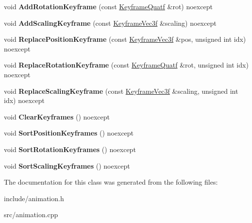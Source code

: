 \begin{DoxyCompactItemize}
\item 
\mbox{\label{class_blade_1_1_animation_a443dc6dcb392227104fe1727ed7b411c}} 
void {\bfseries Add\+Rotation\+Keyframe} (const \hyperlink{struct_blade_1_1_keyframe}{Keyframe\+Quatf} \&rot) noexcept
\item 
\mbox{\label{class_blade_1_1_animation_ad8f71fb524d1e54dec1404dee61c0cd2}} 
void {\bfseries Add\+Scaling\+Keyframe} (const \hyperlink{struct_blade_1_1_keyframe}{Keyframe\+Vec3f} \&scaling) noexcept
\item 
\mbox{\label{class_blade_1_1_animation_a8474b5ddb86f562ee9b8442ea99579a9}} 
void {\bfseries Replace\+Position\+Keyframe} (const \hyperlink{struct_blade_1_1_keyframe}{Keyframe\+Vec3f} \&pos, unsigned int idx) noexcept
\item 
\mbox{\label{class_blade_1_1_animation_abcaaaf273da130260b713c2366d009a8}} 
void {\bfseries Replace\+Rotation\+Keyframe} (const \hyperlink{struct_blade_1_1_keyframe}{Keyframe\+Quatf} \&rot, unsigned int idx) noexcept
\item 
\mbox{\label{class_blade_1_1_animation_acaa08703ede629aac7259ed696bb92f9}} 
void {\bfseries Replace\+Scaling\+Keyframe} (const \hyperlink{struct_blade_1_1_keyframe}{Keyframe\+Vec3f} \&scaling, unsigned int idx) noexcept
\item 
\mbox{\label{class_blade_1_1_animation_a4e627c0196f9a0990cde2c454f853b11}} 
void {\bfseries Clear\+Keyframes} () noexcept
\item 
\mbox{\label{class_blade_1_1_animation_aa723894052e5f46e73c762df2ae55532}} 
void {\bfseries Sort\+Position\+Keyframes} () noexcept
\item 
\mbox{\label{class_blade_1_1_animation_a3b7022dfd85c88327f5e32bd6e393bb1}} 
void {\bfseries Sort\+Rotation\+Keyframes} () noexcept
\item 
\mbox{\label{class_blade_1_1_animation_a5f37f7a7be8395100d0797cb7019907a}} 
void {\bfseries Sort\+Scaling\+Keyframes} () noexcept
\end{DoxyCompactItemize}


The documentation for this class was generated from the following files\+:\begin{DoxyCompactItemize}
\item 
include/animation.\+h\item 
src/animation.\+cpp\end{DoxyCompactItemize}
